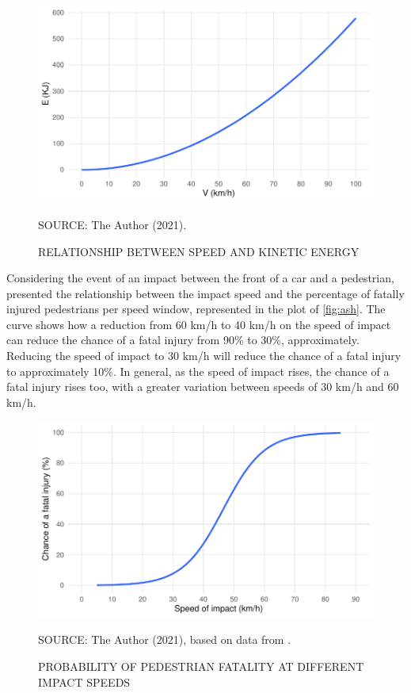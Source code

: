 \begin{figure}[!htbp]
    \centering\footnotesize
    \captionsetup{font=footnotesize}
    \caption{RELATIONSHIP BETWEEN SPEED AND KINETIC ENERGY}
    \includegraphics{fig/kinetic.pdf}
    \label{fig:kinetic}
    \par SOURCE: The Author (2021).
\end{figure}

Considering the event of an impact between the front of a car and a pedestrian, \textcite{Ashton1980} presented the relationship between the impact speed and the percentage of fatally injured pedestrians per speed window, represented in the plot of \autoref{fig:ash}. The curve shows how a reduction from 60 km/h to 40 km/h on the speed of impact can reduce the chance of a fatal injury from 90\% to 30\%, approximately. Reducing the speed of impact to 30 km/h will reduce the chance of a fatal injury to approximately 10\%. In general, as the speed of impact rises, the chance of a fatal injury rises too, with a greater variation between speeds of 30 km/h and 60 km/h. 

\begin{figure}[!htbp]
    \centering\footnotesize
    \captionsetup{font=footnotesize}
    \caption{PROBABILITY OF PEDESTRIAN FATALITY AT DIFFERENT IMPACT SPEEDS}
    \includegraphics{fig/ash.pdf}
    \label{fig:ash}
    \par SOURCE: The Author (2021), based on data from \textcite{Ashton1980}.
\end{figure}

